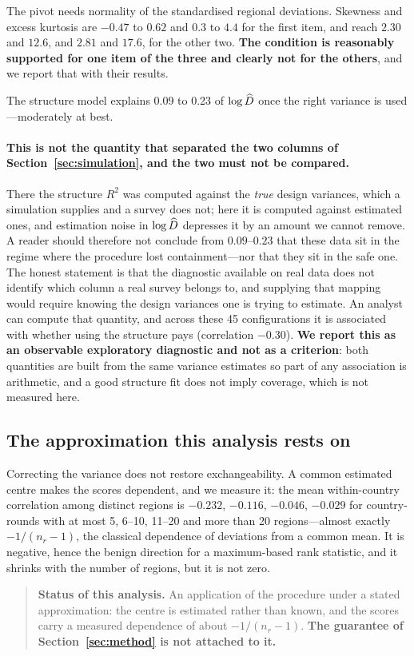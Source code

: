 The pivot needs normality of the standardised regional deviations. Skewness and
excess kurtosis are $-0.47$ to $0.62$ and $0.3$ to $4.4$ for the first item, and
reach $2.30$ and $12.6$, and $2.81$ and $17.6$, for the other two.
\textbf{The condition is reasonably supported for one item of the three and
clearly not for the others}, and we report that with their results.

The structure model explains 0.09 to 0.23 of $\log\widehat D$ once the right variance
is used---moderately at best.

\paragraph{This is not the quantity that separated the two columns of
Section~\ref{sec:simulation}, and the two must not be compared.} There the
structure $R^2$ was computed against the \emph{true} design variances, which a
simulation supplies and a survey does not; here it is computed against estimated
ones, and estimation noise in $\log\widehat D$ depresses it by an amount we cannot
remove. A reader should therefore not conclude from $0.09$--$0.23$ that these
data sit in the regime where the procedure lost containment---nor that they sit
in the safe one. The honest statement is that the diagnostic available on real
data does not identify which column a real survey belongs to, and supplying that
mapping would require knowing the design variances one is trying to estimate. An analyst can compute that quantity, and across
these 45 configurations it is associated with whether using the structure pays
(correlation $-0.30$). \textbf{We report this as an observable exploratory
diagnostic and not as a criterion}: both quantities are built from the same
variance estimates so part of any association is arithmetic, and a good structure
fit does not imply coverage, which is not measured here.

\subsection{The approximation this analysis rests on}

Correcting the variance does not restore exchangeability. A common estimated
centre makes the scores dependent, and we measure it: the mean within-country
correlation among distinct regions is $-0.232$, $-0.116$, $-0.046$, $-0.029$ for
country-rounds with at most 5, 6--10, 11--20 and more than 20 regions---almost
exactly $-1/(n_r-1)$, the classical dependence of deviations from a common mean.
It is negative, hence the benign direction for a maximum-based rank statistic,
and it shrinks with the number of regions, but it is not zero.

\begin{quote}
\textbf{Status of this analysis.} An application of the procedure under a stated
approximation: the centre is estimated rather than known, and the scores carry a
measured dependence of about $-1/(n_r-1)$. \textbf{The guarantee of
Section~\ref{sec:method} is not attached to it.}
\end{quote}
